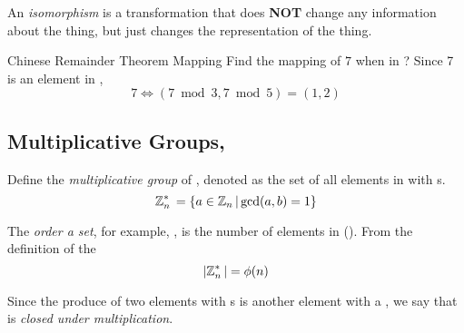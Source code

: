 \begin{definition}[Isomorphism]\label{def:Isomorphism}
  An \emph{isomorphism} is a transformation that does \textbf{NOT} change any information about the thing, but just changes the representation of the thing.
\end{definition}

\begin{example}[]{Chinese Remainder Theorem Mapping}
  Find the mapping of $7$ when in ?
  \tcblower{}
  Since 7 is an element in ,
  \begin{equation*}
    7 \Leftrightarrow (7 \bmod 3, 7 \bmod 5) = (1, 2)
  \end{equation*}
\end{example}

\subsection{\texorpdfstring{Multiplicative Groups, \TextMultiplicativeGroupN{}}{Multiplicative Groups}}\label{Multiplicative_Groups}
\begin{definition}\label{def:Multiplicative_Group}
  Define the \emph{multiplicative group} of \TextIntsModN{}, denoted \TextMultiplicativeGroupN{} as the set of all elements in \TextIntsModN{} with s.
  \begin{equation}\label{eq:Multiplicative_Group}
    \operatorname{\mathbb{Z}}_{n}^{*}{} = \lbrace a \in \operatorname{\mathbb{Z}}_{n}{} \vert \gcd(a, b) = 1 \rbrace
  \end{equation}
\end{definition}

\begin{definition}\label{def:Set_Order}
  The \emph{order a set}, for example, \TextMultiplicativeGroupN{}, is the number of elements in \TextMultiplicativeGroupN{} (\TextSetOrder{\MultiplicativeGroupN{}}).
  From the definition of the 
  \begin{equation}\label{eq:Set_Order_Euler_Phi_Function}
    \lvert \operatorname{\mathbb{Z}}_{n}^{*}{} \rvert = \phi(n)
  \end{equation}

  \begin{remark}\label{rmk:Set_Order_Closed_Multiplication}
    Since the produce of two elements with s is another element with a , we say that \TextSetOrder{\MultiplicativeGroupN{}} is \emph{closed under multiplication}.
  \end{remark}
\end{definition}

